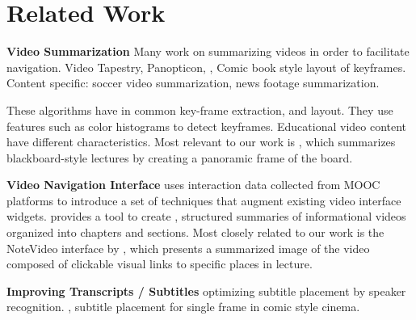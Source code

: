 \section{Related Work}

\textbf{Video Summarization}
Many work on summarizing videos in order to facilitate navigation. \cite{barnes2010video} Video Tapestry, \cite{jackson2013panopticon} Panopticon, \cite{uchihashi1999video}, \cite{hwang2006cinema}\cite{boreczky2000interactive} Comic book style layout of keyframes. Content specific:\cite{ekin2003automatic} soccer video summarization, \cite{} news footage summarization.
 
These algorithms have in common key-frame extraction, and layout. They use features such as color histograms to detect keyframes. Educational video content have different characteristics.
Most relevant to our work is \cite{choudary2007summarization}, which summarizes blackboard-style lectures by creating a panoramic frame of the board.

\textbf{Video Navigation Interface}
\cite{kim2014data} uses interaction data collected from MOOC platforms to introduce a set of techniques that augment existing video interface widgets. \cite{pavel2014video} provides a tool to create , structured summaries of informational videos organized into chapters and sections. 
Most closely related to our work is the NoteVideo interface by \cite{monserrat2013notevideo}, which presents a summarized image of the video composed of clickable visual links to specific places in  lecture.

\textbf{Improving Transcripts / Subtitles}
\cite{hu2015speaker} optimizing subtitle placement by speaker recognition. \cite{kurlander1996comic}, \cite{chun2006automated} subtitle placement for single frame in comic style cinema.



